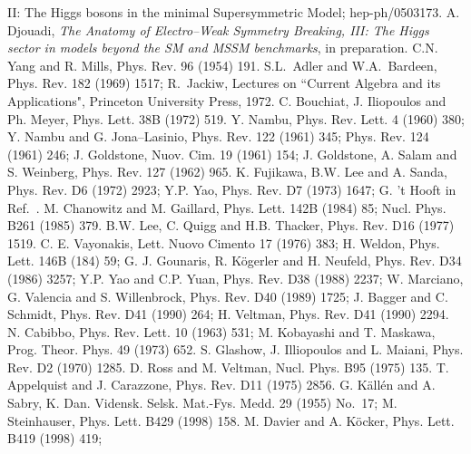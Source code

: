 \begin{thebibliography}{999}
{II: The Higgs bosons in the minimal Supersymmetric Model}; hep-ph/0503173. 
%
 A. Djouadi, {\it The Anatomy of Electro--Weak Symmetry Breaking,
III: The Higgs sector in models beyond the SM and MSSM benchmarks}, in 
preparation. 
 C.N. Yang and R. Mills, Phys. Rev. 96 (1954) 191.
%
 S.L.\ Adler and W.A.\ Bardeen, Phys. Rev. 182 (1969) 1517; 
R.\ Jackiw, Lectures on ``Current Algebra and its Applications", Princeton
University Press, 1972.
%
 C. Bouchiat, J. Iliopoulos and Ph. Meyer, Phys. Lett. 
38B (1972) 519.  
%
Y. Nambu, Phys. Rev. Lett. 4 (1960) 380;
Y. Nambu and G. Jona--Lasinio, Phys. Rev. 122 (1961) 345; \ib Phys. Rev. 124 
(1961) 246; J. Goldstone, Nuov. Cim. 19 (1961) 154;
J. Goldstone, A. Salam and S. Weinberg, Phys. Rev. 127 (1962) 965.
% 
 K. Fujikawa, B.W. Lee and A. Sanda, Phys. Rev. D6 (1972) 
2923; Y.P. Yao, Phys. Rev. D7 (1973) 1647; G. 't Hooft in Ref.~\cite{RENORM}. 
%
M. Chanowitz and M. Gaillard, Phys. Lett. 142B (1984) 85; \ib 
Nucl. Phys. B261 (1985) 379.  
%
B.W. Lee, C. Quigg and H.B. Thacker, Phys. Rev. D16 (1977) 1519.
%
 C. E. Vayonakis, Lett. Nuovo Cimento 17 (1976) 383; 
H. Weldon, Phys. Lett. 146B (184) 59;  
G. J. Gounaris, R. K\"ogerler and H. Neufeld, Phys. Rev. D34 (1986) 3257;
Y.P. Yao and C.P. Yuan, Phys. Rev. D38 (1988) 2237;
W. Marciano, G. Valencia and S. Willenbrock, Phys. Rev. D40 (1989) 1725; 
J. Bagger and C. Schmidt, Phys. Rev. D41 (1990) 264;
H. Veltman, Phys. Rev. D41 (1990) 2294. 
%
N. Cabibbo, Phys. Rev. Lett. 10 (1963)  531;
M. Kobayashi and T. Maskawa, Prog. Theor. Phys. 49 (1973) 652. 
%
 S. Glashow, J. Illiopoulos and L. Maiani, Phys. Rev. D2 (1970)
1285.
%
 D. Ross and M. Veltman, Nucl. Phys. B95 (1975) 135.
%
%
 T. Appelquist and J. Carazzone, Phys. Rev. 
D11 (1975) 2856. 
%
 G. K\"all\'en and A. Sabry, K. Dan. Vidensk. Selsk.
Mat.-Fys. Medd. 29 (1955) No.~17; 
M. Steinhauser, Phys. Lett. B429 (1998) 158. 
%
M. Davier and A. K\"ocker, Phys. Lett. B419 (1998) 419; 

\end{thebibliography}
